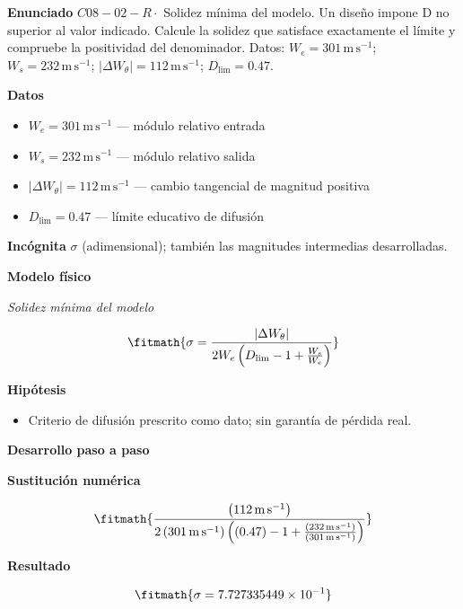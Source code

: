 \documentclass[10pt,openany]{book}
\begin{document}
\begin{tcolorbox}[title={Problema resuelto 2}, studiumworked, breakable]

\noindent\textbf{Enunciado}
\(C08-02-R \cdot\) Solidez mínima del modelo. Un diseño impone D no superior al valor indicado. Calcule la solidez que satisface exactamente el límite y compruebe la positividad del denominador. Datos: \(W_e=301\, \mathrm{m}\,\mathrm{s}^{-1}\); \(W_s=232\, \mathrm{m}\,\mathrm{s}^{-1}\); \(|\Delta W_\theta|=112\, \mathrm{m}\,\mathrm{s}^{-1}\); \(D_{\mathrm{lim}}=0.47\).

\noindent\textbf{Datos}
\begin{itemize}
\item $W_e = 301\,\mathrm{m}\,\mathrm{s}^{-1}$ — módulo relativo entrada
\item $W_s = 232\,\mathrm{m}\,\mathrm{s}^{-1}$ — módulo relativo salida
\item $|\Delta W_\theta| = 112\,\mathrm{m}\,\mathrm{s}^{-1}$ — cambio tangencial de magnitud positiva
\item $D_{\mathrm{lim}} = 0.47$ — límite educativo de difusión
\end{itemize}

\noindent\textbf{Incógnita}
$\sigma$ (adimensional); también las magnitudes intermedias desarrolladas.

\noindent\textbf{Modelo físico}

\noindent\textit{Solidez mínima del modelo}

\[
\fitmath{\sigma=\frac{|\Delta W_\theta|}{2 W_e \left(D_{\mathrm{lim}} - 1 + \frac{W_s}{W_e}\right)}}
\]

\noindent\textbf{Hipótesis}
\begin{itemize}
\item Criterio de difusión prescrito como dato; sin garantía de pérdida real.
\end{itemize}

\noindent\textbf{Desarrollo paso a paso}



\noindent\textbf{Sustitución numérica}

\[
\fitmath{\frac{\left(112\,\mathrm{m}\,\mathrm{s}^{-1}\right)}{2 \left(301\,\mathrm{m}\,\mathrm{s}^{-1}\right) \left(\left(0.47\right) - 1 + \frac{\left(232\,\mathrm{m}\,\mathrm{s}^{-1}\right)}{\left(301\,\mathrm{m}\,\mathrm{s}^{-1}\right)}\right)}}
\]

\noindent\textbf{Resultado}

\[
\fitmath{\sigma=7.727335449\times10^{-1}}
\]


\end{tcolorbox}
\end{document}
